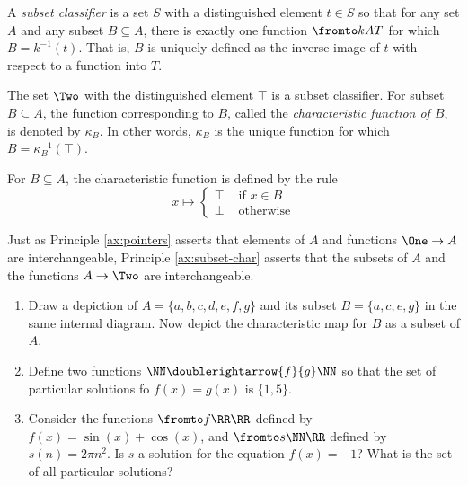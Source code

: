 \begin{defn}\label{def:subset-classifier}
	A \emph{subset classifier} is a set $S$ with a distinguished element $t\in S$ so that for any set $A$ and any subset $B\subseteq A$, there is exactly one function $\fromto kAT$ for which $B = k^{-1}(t)$.
	That is, $B$ is uniquely defined as the inverse image of $t$ with respect to a function into $T$.
\end{defn}

\begin{principle}\label{ax:subset-char}
	The set $\Two$ with the distinguished element $\top$ is a subset classifier.
	For subset $B\subseteq A$, the function corresponding to $B$, called the \emph{characteristic function of $B$}, is denoted by $\kappa_B$.
	In other words, $\kappa_B$ is the unique function for which $B = \kappa_B^{-1}(\top)$.

	For $B\subseteq A$, the characteristic function is defined by the rule
	\[
	x \mapsto
		\begin{cases}
			\top &\text{ if } x\in B\\
			\bot &\text{ otherwise}
		\end{cases}
	\]
\end{principle}

Just as Principle \ref{ax:pointers} asserts that elements of $A$ and functions $\One\to A$ are interchangeable, Principle \ref{ax:subset-char} asserts that the subsets of $A$ and the functions $A\to\Two$ are interchangeable.

\begin{exercises}
	\begin{enumerate}
	\item Draw a depiction of $A=\{a,b,c,d,e,f,g\}$ and its subset $B=\{a,c,e,g\}$ in the same internal diagram. Now depict the characteristic map for $B$ as a subset of $A$.
	
	\item Define two functions $\NN\doublerightarrow{f}{g}\NN$ so that the set of particular solutions fo $f(x)=g(x)$ is $\{1,5\}$. 
	
	\item Consider the functions $\fromto f\RR\RR$ defined by $f(x) = \sin(x) + \cos(x)$, and $\fromto s\NN\RR$ defined by $s(n) = 2\pi n^2$. 
	Is $s$ a solution for the equation $f(x) = -1$? 
	What is the set of all particular solutions?
	\end{enumerate}
		
\end{exercises}


